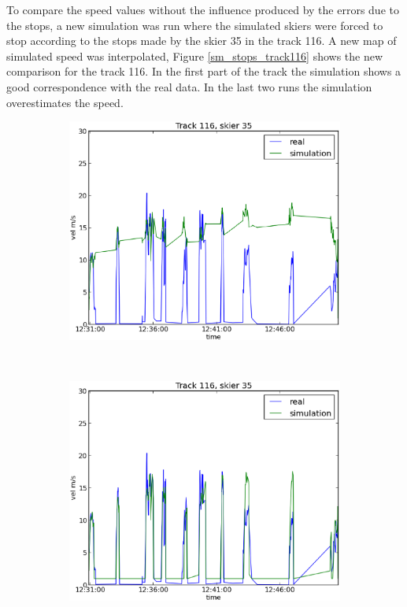 \documentclass[12pt,a4paper,twoside]{book}
\begin{document}
To compare the speed values without the influence produced by the errors due to the stops, a new simulation was run where the simulated skiers were forced to stop according to the stops made by the skier 35 in the track 116. A new map of simulated speed was interpolated, Figure \ref{sm_stops_track116} shows the new comparison for the track 116. In the first part of the track the simulation shows a good correspondence with the real data. In the last two runs the simulation overestimates the speed.

\begin{figure}[!h]
        \centering
        \begin{subfigure}[b]{0.5\textwidth}
                \centering
                \includegraphics[width=\textwidth]{images/sm_track116.eps}
                \caption{}
                \label{Sno_stops}
        \end{subfigure}%
        ~ %
        \begin{subfigure}[b]{0.5\textwidth}
                \centering
                \includegraphics[width=\textwidth]{images/sm_stops_track116.eps}

\end{subfigure}
\end{figure}
\end{document}
